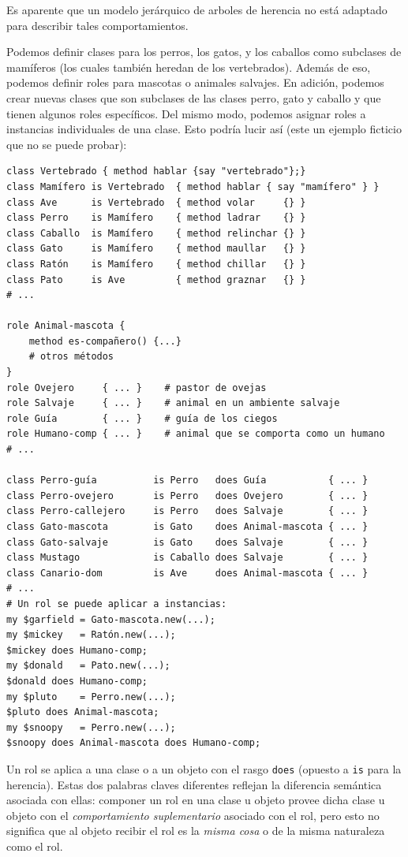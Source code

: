 Es aparente que un modelo jerárquico de arboles de herencia
no está adaptado para describir tales comportamientos.

  
Podemos definir clases para los perros, los gatos, y los 
caballos como subclases de mamíferos (los cuales también heredan
de los vertebrados). Además de eso, podemos definir roles para mascotas
o animales salvajes. En adición, podemos crear nuevas clases
que son subclases de las clases perro, gato y caballo y que 
tienen algunos roles específicos. Del mismo modo, podemos
asignar roles a instancias individuales de una clase. Esto
podría lucir así (este un ejemplo ficticio que no se puede probar):

\begin{verbatim}
class Vertebrado { method hablar {say "vertebrado"};}
class Mamífero is Vertebrado  { method hablar { say "mamífero" } }
class Ave      is Vertebrado  { method volar     {} }
class Perro    is Mamífero    { method ladrar    {} }
class Caballo  is Mamífero    { method relinchar {} }
class Gato     is Mamífero    { method maullar   {} }
class Ratón    is Mamífero    { method chillar   {} }
class Pato     is Ave         { method graznar   {} }
# ...

role Animal-mascota { 
    method es-compañero() {...} 
    # otros métodos
}
role Ovejero     { ... }    # pastor de ovejas
role Salvaje     { ... }    # animal en un ambiente salvaje
role Guía        { ... }    # guía de los ciegos
role Humano-comp { ... }    # animal que se comporta como un humano
# ...

class Perro-guía          is Perro   does Guía           { ... }
class Perro-ovejero       is Perro   does Ovejero        { ... }
class Perro-callejero     is Perro   does Salvaje        { ... }
class Gato-mascota        is Gato    does Animal-mascota { ... }
class Gato-salvaje        is Gato    does Salvaje        { ... }
class Mustago             is Caballo does Salvaje        { ... }
class Canario-dom         is Ave 	 does Animal-mascota { ... }
# ...
# Un rol se puede aplicar a instancias:
my $garfield = Gato-mascota.new(...);
my $mickey   = Ratón.new(...);
$mickey does Humano-comp;
my $donald   = Pato.new(...);
$donald does Humano-comp; 
my $pluto    = Perro.new(...);
$pluto does Animal-mascota;
my $snoopy   = Perro.new(...);
$snoopy does Animal-mascota does Humano-comp;
\end{verbatim}
 
Un rol se aplica a una clase o a un objeto con el rasgo
{\tt does} (opuesto a {\tt is} para la herencia). Estas dos
palabras claves diferentes reflejan la diferencia semántica
asociada con ellas: componer un rol en una clase u objeto
provee dicha clase u objeto con el \emph{comportamiento suplementario}
asociado con el rol, pero esto no significa que al objeto
recibir el rol es la \emph{misma cosa} o de la misma naturaleza como 
el rol.


